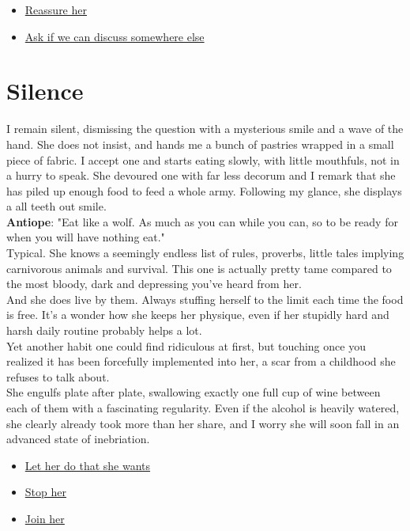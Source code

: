 \documentclass{report}
\newcommand{\speaker}[1]{
	\textbf{#1}: 
}
\newcommand{\glink}[2]{
	\hyperref[#1]{#2}
}
\newcommand{\gsection}[1]{
	\section*{#1}
	\label{#1}
}
\begin{document}
\begin{itemize}
	\item \glink{It's nothing}{Reassure her}
	\item \glink{The garden}{Ask if we can discuss somewhere else}
\end{itemize}

\gsection{Silence}

I remain silent, dismissing the question with a mysterious smile and a wave of the hand. She does not insist, and hands me a bunch of pastries wrapped in a small piece of fabric. I accept one and starts eating slowly, with little mouthfuls, not in a hurry to speak. She devoured one with far less decorum and I remark that she has piled up enough food to feed a whole army. Following my glance, she displays a all teeth out smile.\\

\speaker{Antiope} "Eat like a wolf. As much as you can while you can, so to be ready for when you will have nothing eat."\\

Typical. She knows a seemingly endless list of rules, proverbs, little tales implying carnivorous animals and survival. This one is actually pretty tame compared to the most bloody, dark and depressing you've heard from her.\\

And she does live by them. Always stuffing herself to the limit each time the food is free. It's a wonder how she keeps her physique, even if her stupidly hard and harsh daily routine probably helps a lot.\\

Yet another habit one could find ridiculous at first, but touching once you realized it has been forcefully implemented into her, a scar from a childhood she refuses to talk about.\\

She engulfs plate after plate, swallowing exactly one full cup of wine between each of them with a fascinating regularity. Even if the alcohol is heavily watered, she clearly already took more than her share, and I worry she will soon fall in an advanced state of inebriation.

\begin{itemize}
	\item \glink{Stupor}{Let her do that she wants}
	\item \glink{Sobriety}{Stop her}
	\item \glink{Drunk}{Join her}
\end{itemize}
\end{document}
